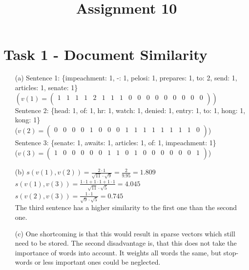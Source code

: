 \documentclass[a4paper]{article}
\date{}
\author{}
\title{\textbf{Assignment 10}}
\begin{document}
\maketitle 
\thispagestyle{fancy}


\section*{Task 1 - Document Similarity}
\begin{enumerate}
	\item[(a)] Sentence 1: \{impeachment: 1, -: 1, pelosi: 1, prepares: 1, to: 2, send: 1, articles: 1, senate: 1\} \\
	$(v(1) = \begin{pmatrix} 1 & 1 & 1 & 1 & 2 & 1 & 1 & 1 & 0 & 0 & 0 & 0 & 0 & 0 & 0 & 0 & 0 \\ \end{pmatrix})$ \\
	Sentence 2: \{head: 1, of: 1, hr: 1, watch: 1, denied: 1, entry: 1, to: 1, hong: 1, kong: 1\} \\
	($v(2) = \begin{pmatrix} 0 & 0 & 0 & 0 & 1 & 0 & 0 & 0 & 1 & 1 & 1 & 1 & 1 & 1 & 1 & 1 & 0 \\ \end{pmatrix}$)\\
	Sentence 3: \{senate: 1, awaits: 1, articles: 1, of: 1, impeachment: 1\}\\	
	($v(3) = \begin{pmatrix} 1 & 0 & 0 & 0 & 0 & 0 & 1 & 1 & 0 & 1 & 0 & 0 & 0 & 0 & 0 & 0 & 1 \\ \end{pmatrix}$)
	\item[(b)] $s(v(1), v(2)) = \frac{2 \cdot 1}{\sqrt{11} \cdot \sqrt{9}} = \frac{2}{9.95} = 1.809$ \\ \linebreak
	$s(v(1), v(3)) = \frac{1 \cdot 1 + 1 \cdot 1 + 1 \cdot 1}{\sqrt{11} \cdot \sqrt{5}} = 4.045$ \\ \linebreak
	$s(v(2), v(3)) = \frac{1 \cdot 1}{\sqrt{9} \cdot \sqrt{5}} = 0.745$ \\ \linebreak	
	The third sentence has a higher similarity to the first one than the second one. 
	
	\item[(c)] 
	One shortcoming is that this would result in sparse vectors which still need to be stored. 
	The second disadvantage is, that this does not take the importance of words into account. 
	It weights all words the same, but stop-words or less important ones could be neglected. 	
\end{enumerate}
\end{document}

